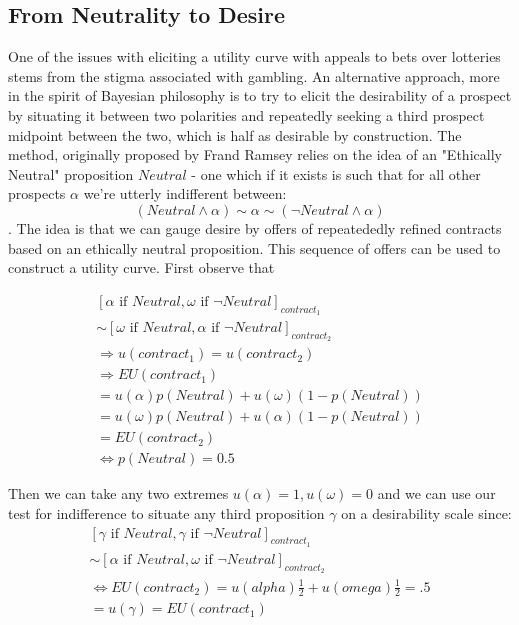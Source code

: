 \documentclass{tufte-handout}
\begin{document}
\subsection*{From Neutrality to Desire}
One of the issues with eliciting a utility curve with appeals to bets over lotteries stems from the stigma associated with gambling. An alternative approach, more in the spirit of Bayesian philosophy is to try to elicit the desirability of a prospect by situating it between two polarities and repeatedly seeking a third prospect midpoint between the two, which is half as desirable by construction. The method, originally proposed by Frand Ramsey relies on the idea of an "Ethically Neutral" proposition $Neutral$ - one which if it exists is such that for all other prospects $\alpha$ we're utterly indifferent between: $$(Neutral \wedge \alpha) \sim \alpha \sim (\neg Neutral \wedge \alpha)$$. \noindent The idea is that we can gauge desire by offers of repeatededly refined contracts based on an ethically neutral proposition. This sequence of offers can be used to construct a utility curve. First observe that 

\begin{equation}
\begin{split}
[ \alpha \text{ if } Neutral, \omega \text{ if } \neg Neutral ]_{contract_{1}} \\  \sim [ \omega  \text{ if } Neutral, \alpha \text{ if } \neg Neutral ]_{contract_{2}} \\   \Rightarrow u(contract_{1})  = u(contract_{2})   \\  \Rightarrow EU(contract_{1}) \\ = u(\alpha)p(Neutral) + u(\omega)(1-p(Neutral)) \\ 
= u(\omega)p(Neutral) + u(\alpha)(1-p(Neutral)) \\ 
= EU(contract_{2})  
\\ \Leftrightarrow p(Neutral) = 0.5
\end{split}
\end{equation}

\noindent Then we can take any two extremes $u(\alpha) = 1, u(\omega) = 0$ and we can use our test for indifference to situate any third proposition $\gamma$ on a desirability scale since: 
\begin{equation} 
\begin{split}
 [\gamma \text{ if } Neutral, \gamma \text{ if } \neg Neutral]_{contract_1} \\ 
 \sim   [\alpha \text{ if } Neutral, \omega \text{ if } \neg Neutral ]_{contract_2} \\
 \Leftrightarrow EU(contract_{2}) = u(alpha)\frac{1}{2}  + u(omega)\frac{1}{2} = .5  \\ = u(\gamma) = EU(contract_{1})
\end{split}
\end{equation}
\end{document}
